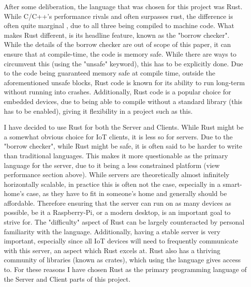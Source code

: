 After some deliberation, the language that was chosen for this project was Rust. While C/C++'s performance rivals and often surpasses rust, the difference is often quite marginal \cite{PerformanceEvalOnMicrocontroller}, due to all three being compiled to machine code. What makes Rust different, is its headline feature, known as the "borrow checker". While the details of the borrow checker are out of scope of this paper, it can ensure that at compile-time, the code is memory safe. While there are ways to circumvent this (using the "unsafe" keyword), this has to be explicitly done. Due to the code being guaranteed memory safe at compile time, outside the aforementioned unsafe blocks, Rust code is known for its ability to run long-term without running into crashes. Additionally, Rust code is a popular choice for embedded devices, due to being able to compile without a standard library (this has to be enabled), giving it flexibility in a project such as this.

I have decided to use Rust for both the Server and Clients. While Rust might be a somewhat obvious choice for IoT clients, it is less so for servers. Due to the "borrow checker", while Rust might be safe, it is often said to be harder to write than traditional languages. This makes it more questionable as the primary language for the server, due to it being a less constrained platform (view performance section above). While servers are theoretically almost infinitely horizontally scalable, in practice this is often not the case, especially in a smart-home's case, as they have to fit in someone's home and generally should be affordable. Therefore ensuring that the server can run on as many devices as possible, be it a Raspberry-Pi, or a modern desktop, is an important goal to strive for. The "difficulty" aspect of Rust can be largely counteracted by personal familiarity with the language. Additionally, having a stable server is very important, especially since all IoT devices will need to frequently communicate with this server, an aspect which Rust excels at. Rust also has a thriving community of libraries (known as crates), which using the language gives access to. For these reasons I have chosen Rust as the primary programming language of the Server and Client parts of this project.

